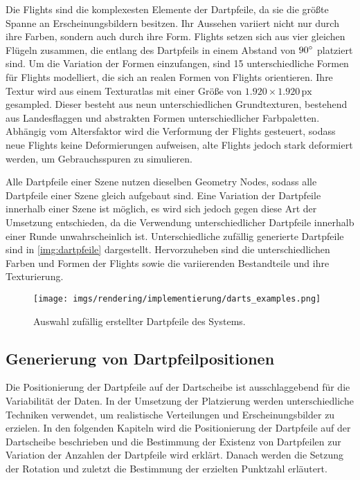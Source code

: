 Die Flights sind die komplexesten Elemente der Dartpfeile, da sie die größte Spanne an Erscheinungsbildern besitzen. Ihr Aussehen variiert nicht nur durch ihre Farben, sondern auch durch ihre Form. Flights setzen sich aus vier gleichen Flügeln zusammen, die entlang des Dartpfeils in einem Abstand von $90^{\circ}$ platziert sind. Um die Variation der Formen einzufangen, sind 15 unterschiedliche Formen für Flights modelliert, die sich an realen Formen von Flights orientieren. Ihre Textur wird aus einem Texturatlas mit einer Größe von $1.920 \times 1.920\,\text{px}$ gesampled. Dieser besteht aus neun unterschiedlichen Grundtexturen, bestehend aus Landesflaggen und abstrakten Formen unterschiedlicher Farbpaletten. Abhängig vom Altersfaktor wird die Verformung der Flights gesteuert, sodass neue Flights keine Deformierungen aufweisen, alte Flights jedoch stark deformiert werden, um Gebrauchsspuren zu simulieren.

\vspace{\baselineskip}
\newpage
\noindent Alle Dartpfeile einer Szene nutzen dieselben Geometry Nodes, sodass alle Dartpfeile einer Szene gleich aufgebaut sind. Eine Variation der Dartpfeile innerhalb einer Szene ist möglich, es wird sich jedoch gegen diese Art der Umsetzung entschieden, da die Verwendung unterschiedlicher Dartpfeile innerhalb einer Runde unwahrscheinlich ist. Unterschiedliche zufällig generierte Dartpfeile sind in \autoref{img:dartpfeile} dargestellt. Hervorzuheben sind die unterschiedlichen Farben und Formen der Flights sowie die variierenden Bestandteile und ihre Texturierung.

\begin{figure}
    \centering
    \texttt{[image: imgs/rendering/implementierung/darts\_examples.png]}
    \caption{Auswahl zufällig erstellter Dartpfeile des Systems.}
    \label{img:dartpfeile}
\end{figure}

\subsection{Generierung von Dartpfeilpositionen}  %
\label{sec:wie_dartpfeil_positionen}

Die Positionierung der Dartpfeile auf der Dartscheibe ist ausschlaggebend für die Variabilität der Daten. In der Umsetzung der Platzierung werden unterschiedliche Techniken verwendet, um realistische Verteilungen und Erscheinungsbilder zu erzielen. In den folgenden Kapiteln wird die Positionierung der Dartpfeile auf der Dartscheibe beschrieben und die Bestimmung der Existenz von Dartpfeilen zur Variation der Anzahlen der Dartpfeile wird erklärt. Danach werden die Setzung der Rotation und zuletzt die Bestimmung der erzielten Punktzahl erläutert.

